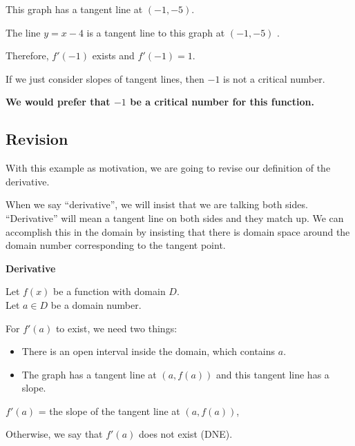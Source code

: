 \documentclass{ximera}
\begin{document}
This graph has a tangent line at $(-1,-5)$.  

The line $y = x - 4$ is a tangent line to this graph at $(-1,-5)$ . 

Therefore, $f'(-1)$ exists and $f'(-1) = 1$.  



If we just consider slopes of tangent lines, then $-1$ is not a critical number. 


\begin{center}
\textbf{\textcolor{red!70!black}{We would prefer that $-1$ be a critical number for this function.}}
\end{center}














\subsection*{Revision}


With this example as motivation, we are going to revise our definition of the derivative. 


When we say ``derivative'', we will insist that we are talking both sides.  ``Derivative'' will mean a tangent line on both sides and they match up.  We can accomplish this in the domain by insisting that there is domain space around the domain number corresponding to the tangent point. 




\begin{definition} \textbf{\textcolor{green!50!black}{Derivative}}  

Let $f(x)$ be a function with domain $D$. \\
Let $a \in D$ be a domain number. 



For $f'(a)$ to exist, we need two things:

\begin{itemize}
\item There is an open interval inside the domain, which contains $a$.
\item The graph has a tangent line at $(a, f(a))$ and this tangent line has a slope.
\end{itemize}



\begin{center}

$f'(a)$ = the slope of the tangent line at $(a, f(a))$,

\end{center}



Otherwise, we say that $f'(a)$ does not exist (DNE).






\end{definition}
\end{document}
